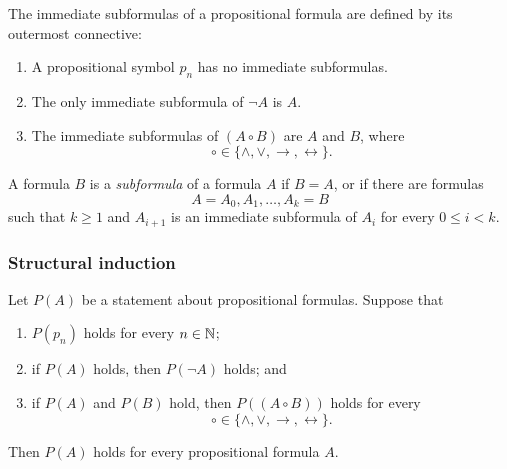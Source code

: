 \documentclass[11pt,a4paper]{amsart}
\begin{document}
\begin{definition}
  The immediate subformulas of a propositional formula are defined by its
  outermost connective:
  \begin{enumerate}
    \item A propositional symbol \(p_n\) has no immediate subformulas.
    \item The only immediate subformula of \(\neg A\) is \(A\).
    \item The immediate subformulas of \((A \mathbin{\circ} B)\) are \(A\)
      and \(B\), where
      \[
        \circ \in \{\land, \lor, \rightarrow, \leftrightarrow\}.
      \]
  \end{enumerate}
\end{definition}

\begin{definition}[Subformulas]
  A formula \(B\) is a \emph{subformula} of a formula \(A\) if \(B=A\), or
  if there are formulas
  \[
    A=A_0,A_1,\ldots,A_k=B
  \]
  such that \(k \geq 1\) and \(A_{i+1}\) is an immediate subformula of
  \(A_i\) for every \(0 \leq i<k\).
\end{definition}

\subsubsection{Structural induction}

\begin{theorem}
  Let \(P(A)\) be a statement about propositional formulas. Suppose that
  \begin{enumerate}
    \item \(P(p_n)\) holds for every \(n \in \mathbb{N}\);
    \item if \(P(A)\) holds, then \(P(\neg A)\) holds; and
    \item if \(P(A)\) and \(P(B)\) hold, then
      \(P((A \mathbin{\circ} B))\) holds for every
      \[
        \circ \in \{\land, \lor, \rightarrow, \leftrightarrow\}.
      \]
  \end{enumerate}
  Then \(P(A)\) holds for every propositional formula \(A\).
\end{theorem}
\end{document}
